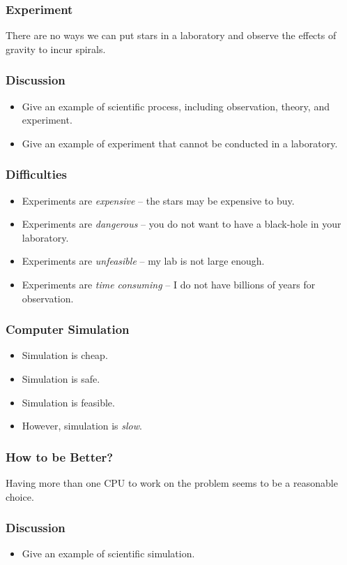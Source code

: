 \documentclass{beamer}
\begin{document}
\begin{CJK}{UTF8}{bsmi}
\begin{frame}
\frametitle{Experiment} \Huge There are no ways we can put stars in a
laboratory and observe the effects of gravity to incur spirals.
\end{frame}

\begin{frame}
\frametitle{Discussion} 
\begin{itemize}
\item Give an example of scientific process, including observation,
  theory, and experiment.
\item Give an example of experiment that cannot be conducted in a
  laboratory.
\end{itemize}
\end{frame}

\begin{frame}
\frametitle{Difficulties} 
\begin{itemize}
\item Experiments are {\em expensive} -- the stars may be expensive to
  buy.
\item Experiments are {\em dangerous} -- you do not want to have a
  black-hole in your laboratory.
\item Experiments are {\em unfeasible} -- my lab is not large enough.
\item Experiments are {\em time consuming} -- I do not have billions
  of years for observation.
\end{itemize}
\end{frame}

\begin{frame}
\frametitle{Computer Simulation} 
\begin{itemize}
\item Simulation is cheap.
\item Simulation is safe.
\item Simulation is feasible.
\item However, simulation is {\em slow}.
\end{itemize}
\end{frame}

\begin{frame}
\frametitle{How to be Better?}
\Huge Having more than one CPU to work on the problem seems to be a
  reasonable choice.
\end{frame}


\begin{frame}
\frametitle{Discussion} 
\begin{itemize}
\item Give an example of scientific simulation.
\end{itemize}
\end{frame}


\end{CJK}
\end{document}
